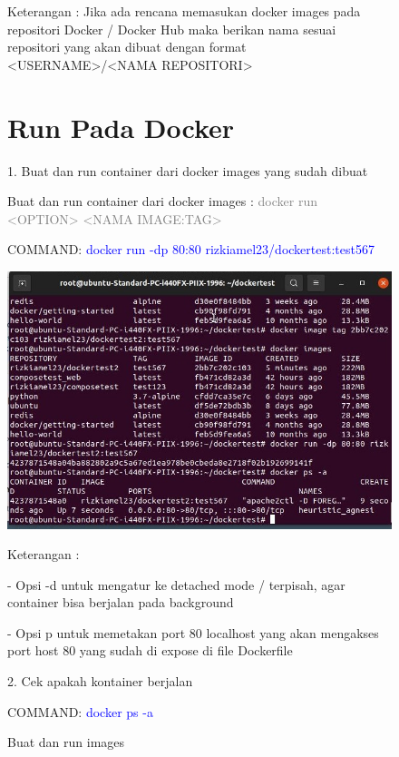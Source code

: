 \begin{figure}
\textcolor{BrickRed}{Keterangan : Jika ada rencana memasukan docker images pada repositori Docker / Docker Hub maka berikan nama sesuai repositori yang akan dibuat dengan format <USERNAME>/<NAMA REPOSITORI>}

\section{Run Pada Docker}

1. Buat dan run container dari docker images yang sudah dibuat

Buat dan run container dari docker images : \textcolor{Gray}{docker run <OPTION> <NAMA IMAGE:TAG>}

COMMAND: \textcolor{Blue}{docker run -dp 80:80 rizkiamel23/dockertest:test567}
    \begin{center}
        \includegraphics[width=\linewidth]{image/29.jpg}
        \caption{Buat dan run images}
        \label{fig:my_figure}
    \end{center}

\textcolor{BrickRed}{Keterangan :}

\textcolor{BrickRed}{- Opsi -d untuk mengatur ke detached mode / terpisah, agar container bisa berjalan pada background}

\textcolor{BrickRed}{- Opsi p untuk memetakan port 80 localhost yang akan mengakses port host 80 yang sudah di expose di file Dockerfile}


2. Cek apakah kontainer berjalan 

COMMAND: \textcolor{Blue}{docker ps -a}
\end{figure}
